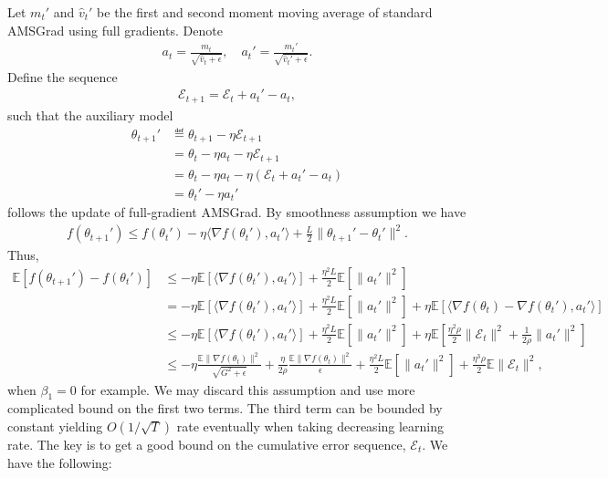 \documentclass[11pt]{article}
\begin{document}
Let $m_t'$ and $\hat v_t'$ be the first and second moment moving average of standard AMSGrad using full gradients. Denote
\begin{align*}
    a_t=\frac{m_t}{\sqrt{\hat v_t+\epsilon}},\quad a_t'=\frac{m_t'}{\sqrt{\hat v_t'+\epsilon}}.
\end{align*}
Define the sequence
\begin{align*}
    \mathcal E_{t+1}=\mathcal E_t+a_t'-a_t,
\end{align*}
such that the auxiliary model
\begin{align*}
    \theta_{t+1}'&\eqdef\theta_{t+1}-\eta \mathcal E_{t+1}\\
    &=\theta_t-\eta a_t-\eta\mathcal E_{t+1}\\
    &=\theta_t-\eta a_t-\eta(\mathcal E_t+a_t'-a_t)\\
    &=\theta_t'-\eta a_t'
\end{align*}
follows the update of full-gradient AMSGrad. By smoothness assumption we have
\begin{align*}
    f(\theta_{t+1}')\leq f(\theta_t')-\eta\langle \nabla f(\theta_t'), a_t'\rangle+\frac{L}{2}\| \theta_{t+1}'-\theta_t'\|^2.
\end{align*}
Thus,
\begin{align*}
    \mathbb E[f(\theta_{t+1}')-f(\theta_t')]&\leq -\eta\mathbb E[\langle \nabla f(\theta_t'), a_t'\rangle]+\frac{\eta^2L}{2}\mathbb E[\|a_t'\|^2]\\
    &=-\eta\mathbb E[\langle \nabla f(\theta_t'), a_t'\rangle]+\frac{\eta^2L}{2}\mathbb E[\|a_t'\|^2]+\eta\mathbb E[\langle \nabla f(\theta_t)-\nabla f(\theta_t'),a_t'\rangle] \\
    &\leq -\eta\mathbb E[\langle \nabla f(\theta_t'), a_t'\rangle]+\frac{\eta^2L}{2}\mathbb E[\|a_t'\|^2]+\eta\mathbb E[\frac{\eta^2\rho}{2}\|\mathcal E_{t}\|^2+\frac{1}{2\rho}\|a_t'\|^2]\\
    &\leq -\eta\frac{\mathbb E\|\nabla f(\theta_t)\|^2}{\sqrt{G^2+\epsilon}}+\frac{\eta}{2\rho}\frac{\mathbb E\|\nabla f(\theta_t)\|^2}{\epsilon}+\frac{\eta^2L}{2}\mathbb E[\|a_t'\|^2]+\frac{\eta^3\rho}{2}\mathbb E\|\mathcal E_{t}\|^2,
\end{align*}
when $\beta_1=0$ for example. We may discard this assumption and use more complicated bound on the first two terms. The third term can be bounded by constant yielding $O(1/\sqrt T)$ rate eventually when taking decreasing learning rate. The key is to get a good bound on the cumulative error sequence, $\mathcal E_t$. We have the following:
\end{document}
